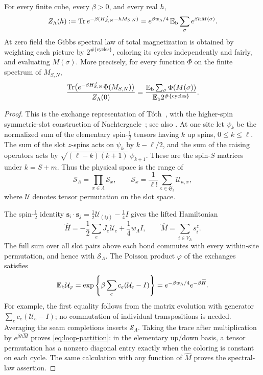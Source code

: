 \begin{proposition}\label{prop:loop-representation}
For every finite cube, every $\beta>0$, and every real $h$,
\begin{equation}\label{eq:loop-partition}
 Z_\Lambda(h):=\operatorname{Tr} e^{-\beta(H^J_{S,N}-hM_{S,N})}
   =e^{\beta w_\Lambda/4}\,
           \mathbb E_{\rm b}\sum_\sigma e^{\beta hM(\sigma)}.
\end{equation}
At zero field the Gibbs spectral law of total magnetization is obtained
by weighting each picture by $2^{\#\{\text{cycles}\}}$, coloring its
cycles independently and fairly, and evaluating $M(\sigma)$.  More
precisely, for every function $\Phi$ on the finite spectrum of
$M_{S,N}$,
\begin{equation}\label{eq:loop-spectral-law}
 \frac{\operatorname{Tr}\bigl(e^{-\beta H^J_{S,N}}\Phi(M_{S,N})\bigr)}{Z_\Lambda(0)}
   =\frac{\mathbb E_{\rm b}\sum_\sigma\Phi(M(\sigma))}
           {\mathbb E_{\rm b}2^{\#\{\text{cycles}\}}}.
\end{equation}
\end{proposition}

\begin{proof}
This is the exchange representation of T\'oth~\cite{Toth1993}, with
the higher-spin symmetric-slot construction of
Nachtergaele~\cite[Section~2.2]{Nachtergaele1994}; see also
\cite[Lemma~2.1]{Ordering}.  At one site let $\psi_k$ be the normalized
sum of the elementary spin-$\tfrac12$ tensors having $k$ up spins,
$0\le k\le\ell$.  The sum of the slot $z$-spins acts on $\psi_k$
by $k-\ell/2$, and the sum of the raising operators acts by
$\sqrt{(\ell-k)(k+1)}\,\psi_{k+1}$.  These are the spin-$S$ matrices
under $k=S+m$.  Thus the physical space is the range of
\[
 \mathcal S_\Lambda=\prod_{x\in\Lambda}\mathcal S_x,
 \qquad \mathcal S_x=\frac1{\ell!}
                  \sum_{\kappa\in\mathfrak S_\ell}\mathcal U_{\kappa,x},
\]
where $\mathcal U$ denotes tensor permutation on the slot space.

The spin-$\tfrac12$ identity
$\boldsymbol s_i\cdot\boldsymbol s_j
 =\frac12\mathcal U_{(ij)}-\frac14I$ gives the lifted Hamiltonian
\[
 \widehat H=-\frac12\sum_eJ_e\mathcal U_e
                      +\frac14w_\Lambda I,
 \qquad \widehat M=\sum_{i\in V_\Lambda}s_i^z.
\]
The full sum over all slot pairs above each bond commutes with every
within-site permutation, and hence with $\mathcal S_\Lambda$.
The Poisson product $\varphi$ of the exchanges satisfies
\[
 \mathbb E_{\rm b}\mathcal U_\varphi
   =\exp\left\{\beta\sum_ec_e(\mathcal U_e-I)\right\}
   =e^{-\beta w_\Lambda/4}e^{-\beta\widehat H}.
\]
For example, the first equality follows from the matrix evolution with
generator $\sum_ec_e(\mathcal U_e-I)$; no commutation of individual
transpositions is needed.  Averaging the seam completions inserts
$\mathcal S_\Lambda$.  Taking the trace after multiplication by
$e^{\beta h\widehat M}$ proves \eqref{eq:loop-partition}: in the
elementary up/down basis, a tensor permutation has a nonzero diagonal
entry exactly when the coloring is constant on each cycle.  The same
calculation with any function of $\widehat M$ proves the spectral-law
assertion.
\end{proof}

